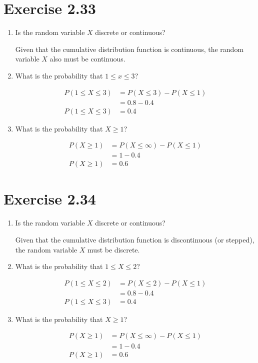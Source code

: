 \documentclass{article}
\begin{document}
\section*{Exercise 2.33}
\begin{enumerate}[\quad(a)]
	\item Is the random variable $X$ discrete or continuous?
	
	Given that the cumulative distribution function is continuous, the random variable $X$ also must be continuous.
	\item What is the probability that $1 \leq x \leq 3$?
	
	\begin{align*}
		P(1\leq X \leq 3) &= P(X \leq 3) - P(X \leq 1)\\
		&= 0.8 - 0.4 \\
		P(1\leq X \leq 3) &= 0.4
	\end{align*}
	
	\item What is the probability that $X \geq 1$?
	
	\begin{align*}
	P(X\geq 1) &= P(X \leq \infty) - P(X \leq 1)\\
	&= 1 - 0.4 \\
	P(X\geq 1) &= 0.6
	\end{align*}
\end{enumerate}
\section*{Exercise 2.34}
\begin{enumerate}
	\item Is the random variable $X$ discrete or continuous?
	
	Given that the cumulative distribution function is discontinuous (or stepped), the random variable $X$ must be discrete.
	\item What is the probability that $1 \leq X \leq 2$?
	
	\begin{align*}
	P(1\leq X \leq 2) &= P(X \leq 2) - P(X \leq 1)\\
	&= 0.8 - 0.4 \\
	P(1\leq X \leq 3) &= 0.4
	\end{align*}
	
	\item What is the probability that $X\geq 1$?
	
	\begin{align*}
	P(X\geq 1) &= P(X \leq \infty) - P(X \leq 1)\\
	&= 1 - 0.4 \\
	P(X\geq 1) &= 0.6
	\end{align*}
	
\end{enumerate}
\end{document}
